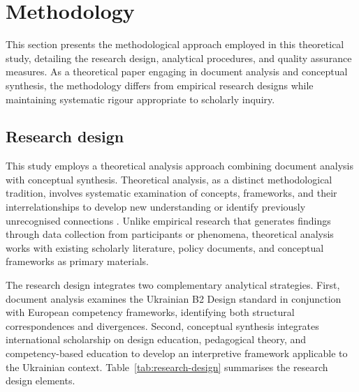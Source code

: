 \documentclass[ed]{acnsart}
\begin{document}
	
	
	\section{Methodology}
	\label{sec:methodology}
	
	This section presents the methodological approach employed in this theoretical study, detailing the research design, analytical procedures, and quality assurance measures. As a theoretical paper engaging in document analysis and conceptual synthesis, the methodology differs from empirical research designs while maintaining systematic rigour appropriate to scholarly inquiry.
	
	\subsection{Research design}
	
	This study employs a theoretical analysis approach combining document analysis with conceptual synthesis. Theoretical analysis, as a distinct methodological tradition, involves systematic examination of concepts, frameworks, and their interrelationships to develop new understanding or identify previously unrecognised connections \cite{Jaakkola2020}. Unlike empirical research that generates findings through data collection from participants or phenomena, theoretical analysis works with existing scholarly literature, policy documents, and conceptual frameworks as primary materials.
	
	The research design integrates two complementary analytical strategies. First, document analysis examines the Ukrainian B2 Design standard in conjunction with European competency frameworks, identifying both structural correspondences and divergences. Second, conceptual synthesis integrates international scholarship on design education, pedagogical theory, and competency-based education to develop an interpretive framework applicable to the Ukrainian context. Table~\ref{tab:research-design} summarises the research design elements.
	
\end{document}
